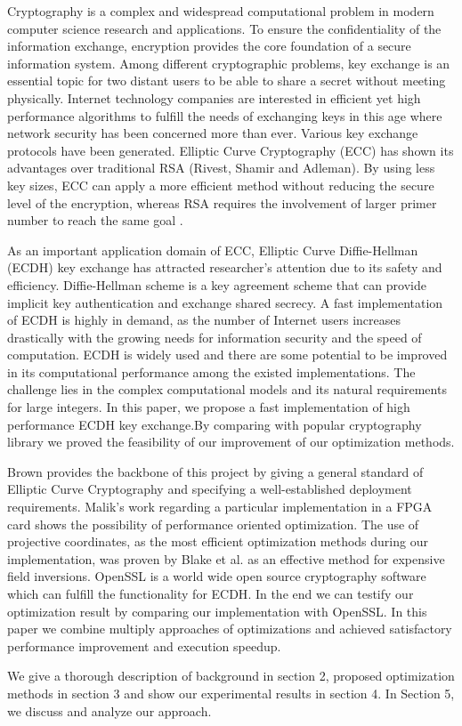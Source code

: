 Cryptography is a complex and widespread computational problem in modern computer science research and applications. To ensure the confidentiality of the information exchange, encryption provides the core foundation of a secure information system. Among different cryptographic problems, key exchange is an essential topic for two distant users to be able to share a secret without meeting physically. Internet technology companies are interested in efficient yet high performance algorithms to fulfill the needs of exchanging keys in this age where network security has been concerned more than ever. Various key exchange protocols have been generated. Elliptic Curve Cryptography (ECC) has shown its advantages over traditional RSA (Rivest, Shamir and Adleman). By using less key sizes, ECC can apply a more efficient method without reducing the secure level of the encryption, whereas RSA requires the involvement of larger primer number to reach the same goal \cite{Malik:2010}.

As an important application domain of ECC, Elliptic Curve Diffie-Hellman (ECDH) key exchange has attracted researcher's attention due to its safety and efficiency. Diffie-Hellman scheme is a key agreement scheme that can provide implicit key authentication\cite{Brown:2009} and exchange shared secrecy. A fast implementation of ECDH is highly in demand, as the number of Internet users increases drastically with the growing needs for information security and the speed of computation. ECDH is widely used and there are some potential to be improved in its computational performance among the existed implementations. The challenge lies in the complex computational models and its natural requirements for large integers. In this paper, we propose a fast implementation of high performance ECDH key exchange.By comparing with popular cryptography library we proved the feasibility of our improvement of our optimization methods. 

Brown provides the backbone of this project by giving a general standard of Elliptic Curve Cryptography\cite{Brown:2009} and specifying a well-established deployment requirements\cite{Brown:2010}. Malik's work regarding a particular implementation in a FPGA card \cite{Malik:2010} shows the possibility of performance oriented optimization. The use of projective coordinates, as the most efficient optimization methods during our implementation, was proven by Blake et al.\cite{Blake:1999} as an effective method for expensive field inversions. OpenSSL is a world wide open source cryptography software which can fulfill the functionality for ECDH\cite{Emilia:2011}. In the end we can testify our optimization result by comparing our implementation with OpenSSL. In this paper we combine multiply approaches of optimizations and achieved satisfactory performance improvement and execution speedup.  

We give a thorough description of background in section 2, proposed optimization methods in section 3 and show our experimental results in section 4. In Section 5, we discuss and analyze our approach.